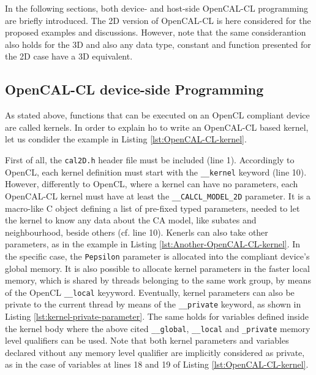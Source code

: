 In the following sections, both device- and host-side OpenCAL-CL
programming are briefly introduced. The 2D version of OpenCAL-CL is
here considered for the proposed examples and discussions. However,
note that the same considerantion also holds for the 3D and also any
data type, constant and function presented for the 2D case have a 3D
equivalent.


\subsection{OpenCAL-CL device-side Programming}

As stated above, functions that can be executed on an OpenCL compliant
device are called kernels. In order to explain ho to write an
OpenCAL-CL based kernel, let us condider the example in Listing
\ref{lst:OpenCAL-CL-kernel}.

First of all, the \verb'cal2D.h' header file must be included (line
1). Accordingly to OpenCL, each kernel definition must start with the
\verb'__kernel' keyword (line 10). However, differently to OpenCL,
where a kernel can have no parameters, each OpenCAL-CL kernel must
have at least the \verb'__CALCL_MODEL_2D' parameter. It is a
macro-like C object defining a list of pre-fixed typed parameters,
needed to let the kernel to know any data about the CA model, like
subates and neighbourhood, beside others (cf. line 10). Kenerls can
also take other parameters, as in the example in Listing
\ref{lst:Another-OpenCAL-CL-kernel}. In the specific case, the
\verb'Pepsilon' parameter is allocated into the compliant device's
global memory. It is also possible to allocate kernel parameters in
the faster local memory, which is shared by threads belonging to the
same work group, by means of the OpenCL \verb'__local'
keyyword. Eventually, kernel parameters can also be private to the
current thread by means of the \verb'__private' keyword, as shown in
Listing \ref{lst:kernel-private-parameter}. The same holds for
variables defined inside the kernel body where the above cited
\verb'__global', \verb'__local' and \verb'_private' memory level
qualifiers can be used. Note that both kernel parameters and variables
declared vithout any memory level qualifier are implicitly considered
as private, as in the case of variables at lines 18 and 19 of Listing
\ref{lst:OpenCAL-CL-kernel}.

